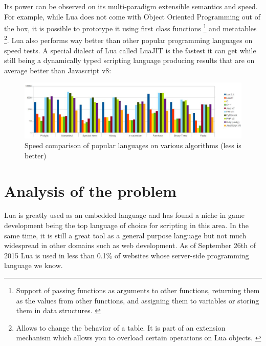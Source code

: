 \documentclass{article}
\begin{document}
Its power can be observed on its multi-paradigm extensible semantics and speed. For example, while Lua does not come with Object Oriented Programming out of the box, it is possible to prototype it using first class functions \footnote{Support of passing functions as arguments to other functions, returning them as the values from other functions, and assigning them to variables or storing them in data structures. \autocite{wikifunc}} and metatables \footnote{Allows to change the behavior of a table. It is part of an extension mechanism which allows you to overload certain operations on Lua objects. \autocite{luausersmeta} \autocite[117]{pil}}. Lua also performs way better than other popular programming languages on speed tests. A special dialect of Lua called LuaJIT is the fastest it can get while still being a dynamically typed scripting language\autocite[8]{modlua} producing results that are on average better than Javascript v8: \\

\clearpage
\begin{figure}[h]
\includegraphics[scale=0.4]{speed.png}
\caption{\label{fig:speedcomparison} Speed comparison of popular languages on various algorithms (less is better)}
\end{figure}

\newpage
\section{Analysis of the problem}

Lua is greatly used as an embedded language and has found a niche in game development being the top language of choice for scripting in this area\autocite{engine}. In the same time, it is still a great tool as a general purpose language but not much widespread in other domains such as web development. As of September 26th of 2015 Lua is used in less than 0.1\% of websites whose server-side programming language we know\autocite{w3server}. \\
\end{document}
